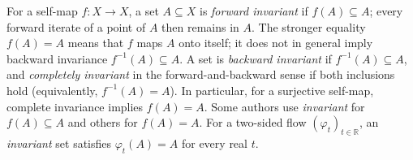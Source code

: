 
For a self-map $f:X\to X$, a set $A\subseteq X$ is \emph{forward invariant} if $f(A)\subseteq A$; every forward iterate of a point of $A$ then remains in $A$. The stronger equality $f(A)=A$ means that $f$ maps $A$ onto itself; it does not in general imply backward invariance $f^{-1}(A)\subseteq A$. A set is \emph{backward invariant} if $f^{-1}(A)\subseteq A$, and \emph{completely invariant} in the forward-and-backward sense if both inclusions hold (equivalently, $f^{-1}(A)=A$). In particular, for a surjective self-map, complete invariance implies $f(A)=A$. Some authors use \emph{invariant} for $f(A)\subseteq A$ and others for $f(A)=A$. For a two-sided flow $(\varphi_t)_{t\in\mathbb R}$, an \emph{invariant} set satisfies $\varphi_t(A)=A$ for every real $t$.
